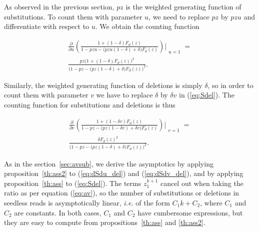 \documentclass{article}
\begin{document}
As observed in the previous section, $pz$ is the weighted generating
function of substitutions. To count them with parameter $u$, we need to
replace $pz$ by $pzu$ and differentiate with respect to $u$. We obtain the
counting function

\begin{align}
\frac{\partial}{\partial u}
\left( \frac{1+(1-\delta)F_d(z)}
  {1-pzu - \big(pzu(1-\delta) + \delta\big)F_d(z)} \right)
\Biggr|_{\substack{\\u=1}} = \nonumber \\
\frac{pz\big(1+(1-\delta)F_d(z)\big)^2}
  {\big( 1-pz - \big(pz(1-\delta) + \delta\big)F_d(z) \big)^2}.
\label{eq:dSdu_del}
\end{align}

Similarly, the weighted generating function of deletions is simply
$\delta$, so in order to count them with parameter $v$ we have to replace
$\delta$ by $\delta v$ in (\ref{eq:Sdel}). The counting function for
substitutions and deletions is thus

\begin{align}
\frac{\partial}{\partial v}
\left( \frac{1+(1-\delta v)F_d(z)}
  {1-pz - \big(pz(1-\delta v) + \delta v\big)F_d(z)} \right)
\Biggr|_{\substack{\\v=1}} = \nonumber \\
\frac{\delta F_d(z)^2}{\big(
  1-pz - \big(pz(1-\delta) + \delta\big)F_d(z) \big)^2}.
\label{eq:dSdv_del}
\end{align}

As in the section~\ref{sec:avsub}, we derive the asymptotics by applying
proposition~\ref{th:ass2} to (\ref{eq:dSdu_del}) and (\ref{eq:dSdv_del}),
and by applying proposition~\ref{th:ass} to (\ref{eq:Sdel}). The terms
$z_1^{k+1}$ cancel out when taking the ratio as per equation
(\ref{eq:av}), so the number of substitutions or deletions in seedless
reads is asymptotically linear, \textit{i.e.} of the form $C_1k+C_2$,
where $C_1$ and $C_2$ are constants. In both cases, $C_1$ and $C_2$ have
cumbersome expressions, but they are easy to compute from
propositions~\ref{th:ass} and \ref{th:ass2}.
\end{document}
